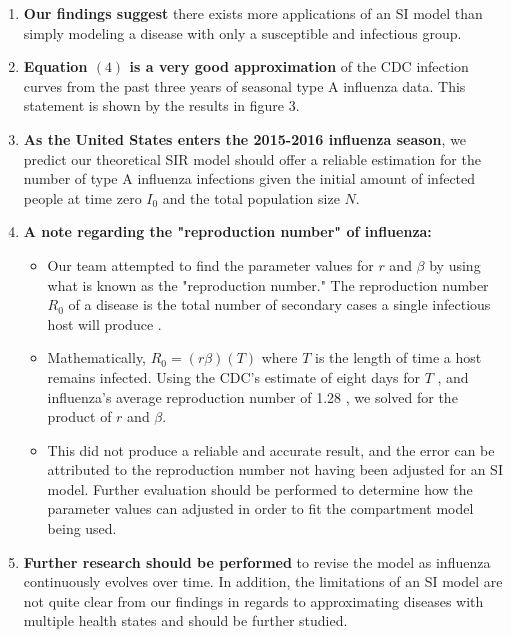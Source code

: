 \documentclass[a0, landscape, final]{a0poster}
\begin{document}
\begin{multicols}{4}
\vfill
\columnbreak



\begin{definition*}[\textcolor{white}{Conclusions and Future Research}]
 
\begin{enumerate}
\item{\textcolor{BrickRed}{\textbf{Our findings suggest}} there exists more applications of an SI model than simply modeling a disease with only a susceptible and infectious group. }
\item{\textcolor{BrickRed}{\textbf{Equation $(4)$ is a very good approximation}} of the CDC infection curves from the past three years of seasonal type A influenza data. This statement is shown by the results in figure 3. }
\item{\textcolor{BrickRed}{\textbf{As the United States enters the 2015-2016 influenza season}}, we predict our theoretical SIR model should offer a reliable estimation for the number of type A influenza infections given the initial amount of infected people at time zero $I_0$ and the total population size $N$. } 
\item{\textcolor{BrickRed}{\textbf{A note regarding the "reproduction number" of influenza:}}}
\begin{itemize}
	\item{Our team attempted to find the parameter values for $r$ and $\beta$ by using what is known as the "reproduction number." The reproduction number $R_0$ of a disease is the total number of secondary cases a single infectious host will produce \cite{Chitnis:2011ab}. }
	\item{Mathematically, $R_0 = (r\beta)(T)$ where $T$ is the length of time a host remains infected. Using the CDC's estimate of eight days for $T$ \cite{Disease-Control:2013aa}, and influenza's average reproduction number of 1.28 \cite{Chowell:2007aa}, we solved for the product of $r$ and $\beta$. }
	\item{This did not produce a reliable and accurate result, and the error can be attributed to the reproduction number not having been adjusted for an SI model.  Further evaluation should be performed to determine how the parameter values can adjusted in order to fit the compartment model being used.}
	\end{itemize}
\item{\textcolor{BrickRed}{\textbf{Further research should be performed}} to revise the model as influenza continuously evolves over time. In addition, the limitations of an SI model are not quite clear from our findings in regards to approximating diseases with multiple health states and should be further studied. }
\end{enumerate}
\end{definition*}



\end{multicols}
\end{document}
